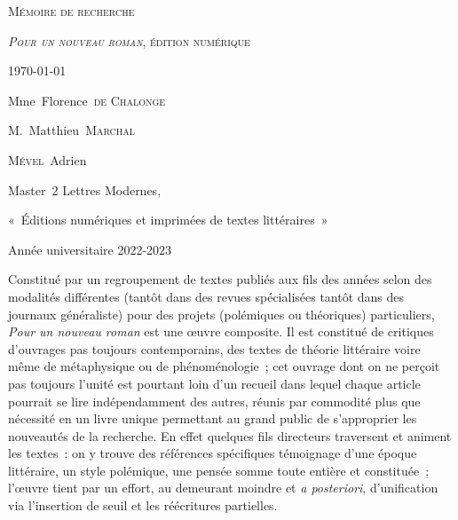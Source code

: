 \documentclass[12pt, a4paper]{article}
\begin{document}


\begin{titlepage}
  

\vspace*{3cm}

 
\begin{center}
\textsc{\huge Mémoire de recherche}

\textsc{\textit{Pour un nouveau roman}, édition numérique}



\today


\vspace*{2cm}
Mme~Florence~\textsc{de Chalonge}


M.~Matthieu~\textsc{Marchal}




\vspace*{11cm}
\small
\textsc{Mével}~Adrien

Master~2 Lettres Modernes,

«~Éditions numériques et imprimées de textes littéraires~»

\vspace*{2.5cm}
Année universitaire 2022-2023




\end{center}


\end{titlepage}	


\newcommand{\punr}{\textit{Pour un nouveau roman}}
\newcommand{\robbe}{Alain~Robbe-Grillet}
\newcommand{\galia}{Galia~\textsc{Yanoshevsky}}
\newcommand{\op}{\textit{Op. cit.}, p.~}
\newcommand{\fullgalia}{\textsc{Yanoshevsky} Galia, \textit{Les discours du Nouveau Roman~: Essais, entretiens, débats}, Villeneuve d'Ascq, Presses universitaires du Septentrion, 2006, p.~}

\vspace*{3cm}


Constitué par un regroupement de textes publiés aux fils des années selon des modalités différentes (tantôt dans des revues spécialisées tantôt dans des journaux généraliste) pour des projets (polémiques ou théoriques) particuliers, \punr{} est une œuvre composite. Il est constitué de critiques d'ouvrages pas toujours contemporains, des textes de théorie littéraire voire même de métaphysique ou de phénoménologie~; cet ouvrage dont on ne perçoit pas toujours l'unité est pourtant loin d'un recueil dans lequel chaque article pourrait se lire indépendamment des autres, réunis par commodité plus que nécessité en un livre unique permettant au grand public de s'approprier les nouveautés de la recherche. En effet quelques fils directeurs traversent et animent les textes~: on y trouve des références spécifiques témoignage d'une époque littéraire, un style polémique, une pensée somme toute entière et constituée~; l'œuvre tient par un effort, au demeurant moindre et \textit{a posteriori}, d'unification via l'insertion de seuil et les réécritures partielles.
\end{document}
